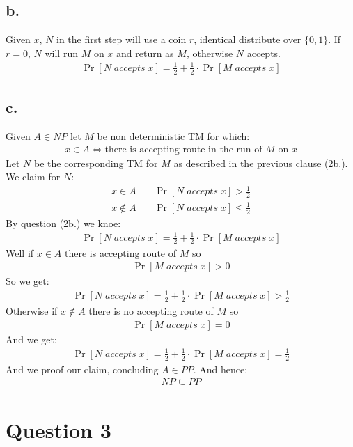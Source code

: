 \documentclass[11pt]{article}
\theoremstyle{plain}
\theoremstyle{nonumberplainnobrackets}
\begin{document}
\subsection*{b.} Given $x$, $N$ in the first step will use a coin $r$, identical distribute over $\{0,1\}$. If $r=0$, $N$ will run $M$ on $x$ and return as $M$, otherwise $N$ accepts.
\begin{align*}
\Pr[N\;accepts\;x]=\frac{1}{2}+\frac{1}{2}\cdot \Pr[M\;accepts\;x]
\end{align*}
\subsection*{c.} Given $A\in NP$ let $M$ be non deterministic TM for which:
\begin{align*}
x\in A \iff \text{there is accepting route in the run of } M \text{ on } x
\end{align*}
Let $N$ be the corresponding TM for $M$ as described in the previous clause (2b.). We claim for $N$: 
\begin{align*}
x\in A&\quad \Pr[N\;accepts\;x]>\frac{1}{2}\\
x\notin A&\quad \Pr[N\;accepts\;x]\le\frac{1}{2}
\end{align*}
By question (2b.) we knoe:
\begin{align*}
\Pr[N\;accepts\;x]= \frac{1}{2}+\frac{1}{2}\cdot \Pr[M\;accepts\;x]
\end{align*}
Well if $x\in A$ there is accepting route of $M$ so
\begin{align*}
 \Pr[M\;accepts\;x] > 0
\end{align*}
So we get:
\begin{align*}
\Pr[N\;accepts\;x]= \frac{1}{2}+\frac{1}{2}\cdot \Pr[M\;accepts\;x] >  \frac{1}{2}
\end{align*}
Otherwise if $x\notin A$ there is no accepting route of $M$ so
\begin{align*}
\Pr[M\;accepts\;x] = 0
\end{align*}
And we get:
\begin{align*}
\Pr[N\;accepts\;x]= \frac{1}{2}+\frac{1}{2}\cdot \Pr[M\;accepts\;x] =  \frac{1}{2}
\end{align*}
And we proof our claim, concluding $A\in PP$. And hence:
\begin{align*}
NP\subseteq PP
\end{align*}
\section*{Question 3}
\end{document}
